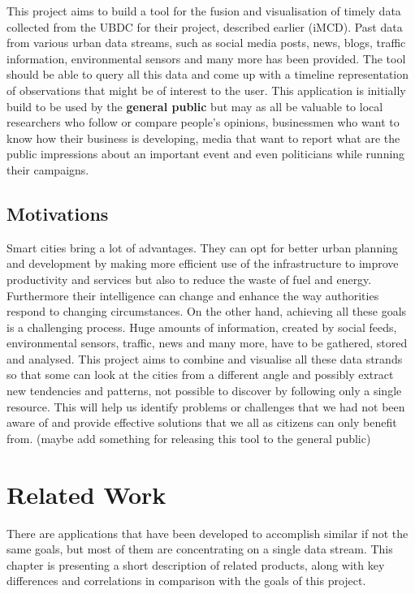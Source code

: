 \documentclass{l4proj}
\begin{document}
This project aims to build a tool for the fusion and visualisation of timely data collected from the UBDC for their project, described earlier (iMCD). Past data from various urban data streams, such as social media posts, news, blogs, traffic information, environmental sensors and many more has been provided. The tool should be able to query all this data and come up with a timeline representation of observations that might be of interest to the user. This application is initially build to be used by the \textbf{general public} but may as all be valuable to local researchers who follow or compare people’s opinions, businessmen who want to know how their business is developing, media that want to report what are the public impressions about an important event and even politicians while running their campaigns.   

\section{Motivations}

Smart cities bring a lot of advantages. They can opt for better urban planning and development by making more efficient use of the infrastructure to improve productivity and services but also to reduce the waste of fuel and energy. Furthermore their intelligence can change and enhance the way authorities respond to changing circumstances. On the other hand, achieving all these goals is a challenging process. Huge amounts of information, created by social feeds, environmental sensors, traffic, news and many more, have to be gathered, stored and analysed. This project aims to combine and visualise all these data strands so that some can look at the cities from a different angle and possibly extract new tendencies and patterns, not possible to discover by following only a single resource. This will help us identify problems or challenges that we had not been aware of and provide effective solutions that we all as citizens can only benefit from. (maybe add something for releasing this tool to the general public)

\chapter{Related Work}
There are applications that have been developed to accomplish similar if not the same goals, but most of them are concentrating on a single data stream. This chapter is presenting a short description of related products, along with key differences and correlations in comparison with the goals of this project.   
\end{document}
